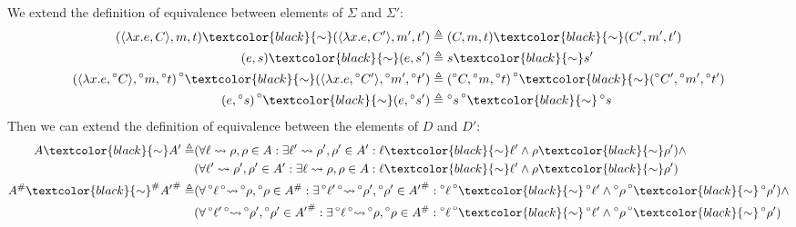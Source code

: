 \documentclass[acmsmall,review]{acmart}\settopmatter{printfolios=true,printccs=false,printacmref=false}
\theoremstyle{definition}
\theoremstyle{plain}
\newcommand*{\A}[1]{\prescript{\circ}{}{#1}}
\newcommand*{\Abs}[1]{{#1}^{\#}}
\newcommand*{\mem}{m}
\newcommand*{\semarrow}{\rightsquigarrow}
\newcommand*{\equivalent}[1][black]{\textcolor{#1}{\sim}}
\begin{document}
We extend the definition of equivalence between elements of $\Sigma$ and $\Sigma'$:
\begin{align*}
  (\langle\lambda x.e,C\rangle,\mem,t)\equivalent(\langle\lambda x.e,C'\rangle,\mem',t')                       & \triangleq(C,\mem,t)\equivalent(C',\mem',t')                       \\
  (e,s)\equivalent(e,s')                                                                                       & \triangleq s\equivalent s'                                         \\
  (\langle\lambda x.e,\A{C}\rangle,\A\mem,\A{t})\A\equivalent(\langle\lambda x.e,\A{C}'\rangle,\A\mem',\A{t}') & \triangleq(\A{C},\A\mem,\A{t})\A\equivalent(\A{C}',\A\mem',\A{t}') \\
  (e,\A{s})\A\equivalent(e,\A{s}')                                                                             & \triangleq\A{s}\A\equivalent\A{s}
\end{align*}
Then we can extend the definition of equivalence between the elements of $D$ and $D'$:
\begin{align*}
  A\equivalent A'\triangleq                 & (\forall\ell\semarrow\rho,\rho\in A:\exists\ell'\semarrow\rho',\rho'\in A':\ell\equivalent\ell'\land\rho\equivalent\rho')\land                                       \\
                                            & (\forall\ell'\semarrow\rho',\rho'\in A':\exists\ell\semarrow\rho,\rho\in A:\ell\equivalent\ell'\land\rho\equivalent\rho')                                            \\
  \Abs{A}\Abs\equivalent \Abs{A'}\triangleq & (\forall\A\ell\A\semarrow\A\rho,\A\rho\in\Abs{A}:\exists\A\ell'\A\semarrow\A\rho',\A\rho'\in\Abs{A'}:\A\ell\A\equivalent\A\ell'\land\A\rho\A\equivalent\A\rho')\land \\
                                            & (\forall\A\ell'\A\semarrow\A\rho',\A\rho'\in\Abs{A'}:\exists\A\ell\A\semarrow\A\rho,\A\rho\in\Abs{A}:\A\ell\A\equivalent\A\ell'\land\A\rho\A\equivalent\A\rho')
\end{align*}
\end{document}
